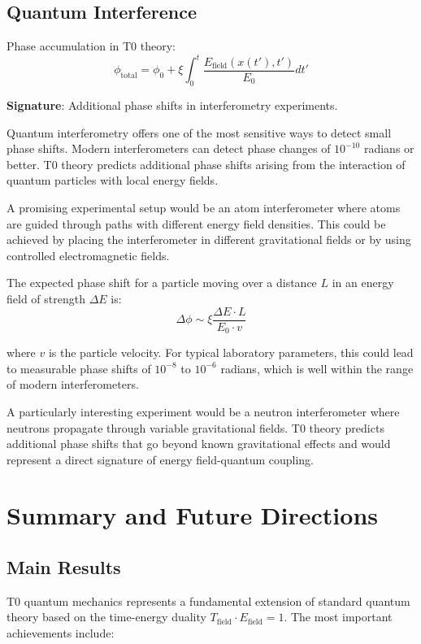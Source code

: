 \documentclass[12pt,a4paper]{article}
\newcommand{\xipar}{\xi}
\theoremstyle{definition}
\theoremstyle{remark}
\begin{document}
\subsection{Quantum Interference}

Phase accumulation in T0 theory:
\begin{equation}
	\phi_{\text{total}} = \phi_0 + \xipar \int_0^t \frac{E_{\text{field}}(x(t'), t')}{E_0} dt'
	\label{eq:phase_accumulation}
\end{equation}

\textbf{Signature}: Additional phase shifts in interferometry experiments.

Quantum interferometry offers one of the most sensitive ways to detect small phase shifts. Modern interferometers can detect phase changes of $10^{-10}$ radians or better. T0 theory predicts additional phase shifts arising from the interaction of quantum particles with local energy fields.

A promising experimental setup would be an atom interferometer where atoms are guided through paths with different energy field densities. This could be achieved by placing the interferometer in different gravitational fields or by using controlled electromagnetic fields.

The expected phase shift for a particle moving over a distance $L$ in an energy field of strength $\Delta E$ is:
$$\Delta \phi \sim \xipar \frac{\Delta E \cdot L}{E_0 \cdot v}$$

where $v$ is the particle velocity. For typical laboratory parameters, this could lead to measurable phase shifts of $10^{-8}$ to $10^{-6}$ radians, which is well within the range of modern interferometers.

A particularly interesting experiment would be a neutron interferometer where neutrons propagate through variable gravitational fields. T0 theory predicts additional phase shifts that go beyond known gravitational effects and would represent a direct signature of energy field-quantum coupling.

\section{Summary and Future Directions}

\subsection{Main Results}

T0 quantum mechanics represents a fundamental extension of standard quantum theory based on the time-energy duality $T_{\text{field}} \cdot E_{\text{field}} = 1$. The most important achievements include:
\end{document}
